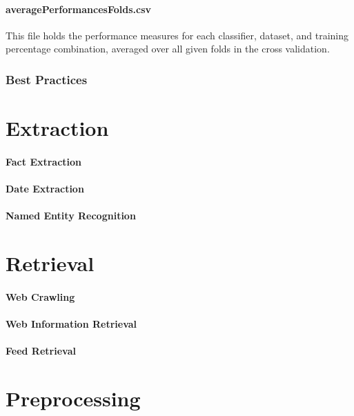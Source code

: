 \documentclass[a4paper,twoside]{book}      %
\begin{document}
\paragraph{averagePerformancesFolds.csv} This file holds the performance measures for each classifier, dataset, and training percentage combination, averaged over all given folds in the cross validation.

\subsubsection{Best Practices}
\label{sec:bpTextClassification}


\section{Extraction}
\paragraph{Fact Extraction}
\paragraph{Date Extraction}
\paragraph{Named Entity Recognition}

\section{Retrieval}
\paragraph{Web Crawling}
\paragraph{Web Information Retrieval}
\paragraph{Feed Retrieval}

\section{Preprocessing}
\end{document}
